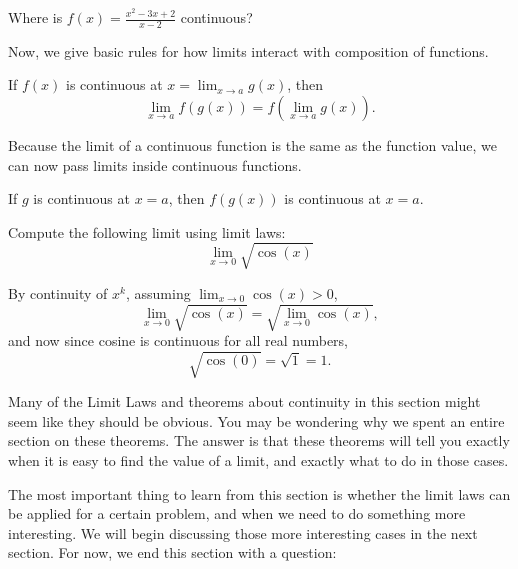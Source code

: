 \documentclass{ximera}
\begin{document}
\begin{question}
  Where is $f(x) = \frac{x^2-3x+2}{x-2}$ continuous?
  \begin{multipleChoice}
  \end{multipleChoice}
\end{question}


Now, we give basic rules for how limits interact with composition
of functions.

\begin{theorem}
  If $f(x)$ is continuous at $x = \displaystyle\lim_{x\to a} g(x)$, then
  \[
  \displaystyle\lim_{x\to a} f(g(x)) = f(\lim_{x\to a} g(x)).
  \]
\end{theorem}

Because the limit of a continuous function is the same as the function
value, we can now pass limits inside continuous functions.

\begin{corollary}
If $g$ is continuous at $x=a$, then $f(g(x))$ is continuous at $x=a$.
\end{corollary}

\begin{example}
  Compute the following limit using limit laws:
  \[
  \displaystyle\lim_{x \to 0} \sqrt{\cos(x)}
  \]
  \begin{explanation}
    By continuity of $x^k$, assuming $\lim_{x \to 0} \cos(x) >0$,
    \[
    \lim_{x \to 0} \sqrt{\cos(x)} = \sqrt{\lim_{x \to 0} \cos(x)},
    \]
    and now since cosine is continuous for all real numbers,
    \[
    \sqrt{\cos(0)} = \sqrt{1} = 1.
    \]
  \end{explanation}
\end{example}

Many of the Limit Laws and theorems about continuity in this section
might seem like they should be obvious.  You may be wondering why we
spent an entire section on these theorems.  The answer is that these
theorems will tell you exactly when it is easy to find the value of a
limit, and exactly what to do in those cases.

The most important thing to learn from this section is whether the
limit laws can be applied for a certain problem, and when we need to
do something more interesting.  We will begin discussing those more
interesting cases in the next section.  For now, we end this section
with a question:
\end{document}
